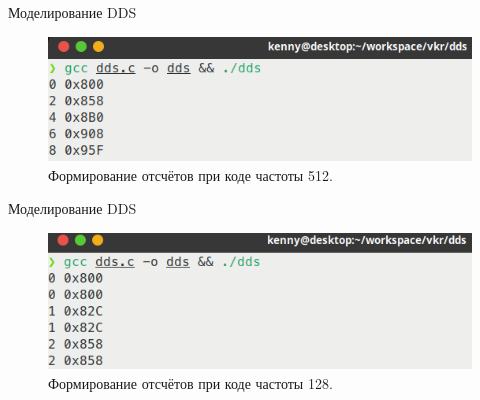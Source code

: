 \documentclass[10pt]{beamer}
\begin{document}
	
\begin{frame}{Моделирование DDS}
  \begin{figure}
  \includegraphics[width=1\textwidth]{dds512}
  \caption{Формирование отсчётов при коде частоты 512.}
  \end{figure}
\end{frame}
	

\begin{frame}{Моделирование DDS}
  \begin{figure}
  \includegraphics[width=1\textwidth]{dds128}
  \caption{Формирование отсчётов при коде частоты 128.}
  \end{figure}
\end{frame}
\end{document}
